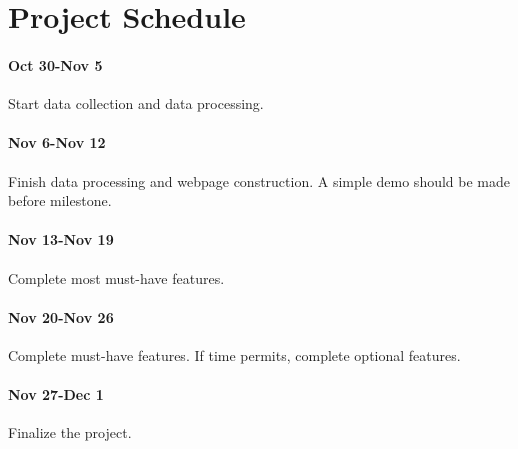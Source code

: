 \documentclass[12pt, fullpage,letterpaper]{article}
\begin{document}
\section{Project Schedule}
\paragraph{Oct 30-Nov 5} Start data collection and data processing.
\paragraph{Nov 6-Nov 12} Finish data processing and webpage construction. A simple demo should be made before milestone.
\paragraph{Nov 13-Nov 19} Complete most must-have features.
\paragraph{Nov 20-Nov 26} Complete must-have features. If time permits, complete optional features.
\paragraph{Nov 27-Dec 1} Finalize the project.
\end{document}

